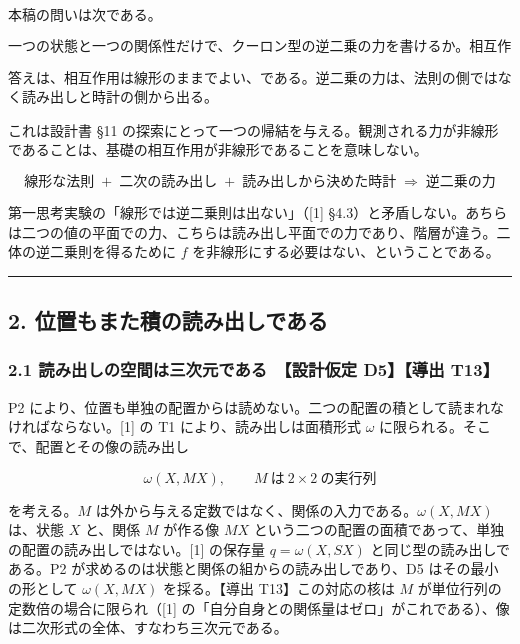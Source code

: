 \documentclass[
  a4paper,
]{ltjsarticle}
\begin{document}
本稿の問いは次である。

\[
\boxed{\text{一つの状態と一つの関係性だけで、クーロン型の逆二乗の力を書けるか。相互作用は線形のままでよいか。}}
\]

答えは、相互作用は線形のままでよい、である。逆二乗の力は、法則の側ではなく読み出しと時計の側から出る。

これは設計書 §11
の探索にとって一つの帰結を与える。観測される力が非線形であることは、基礎の相互作用が非線形であることを意味しない。

\[
\boxed{\;\text{線形な法則}\;+\;\text{二次の読み出し}\;+\;\text{読み出しから決めた時計}\;\Longrightarrow\;\text{逆二乗の力}\;}
\]

第一思考実験の「線形では逆二乗則は出ない」（{[}1{]}
§4.3）と矛盾しない。あちらは二つの値の平面での力、こちらは読み出し平面での力であり、階層が違う。二体の逆二乗則を得るために
\(f\) を非線形にする必要はない、ということである。

\begin{center}\rule{0.5\linewidth}{0.5pt}\end{center}

\subsection{2.
位置もまた積の読み出しである}\label{ux4f4dux7f6eux3082ux307eux305fux7a4dux306eux8aadux307fux51faux3057ux3067ux3042ux308b}

\subsubsection{2.1 読み出しの空間は三次元である　【設計仮定 D5】【導出
T13】}\label{ux8aadux307fux51faux3057ux306eux7a7aux9593ux306fux4e09ux6b21ux5143ux3067ux3042ux308b-ux8a2dux8a08ux4eeeux5b9a-d5ux5c0eux51fa-t13}

P2
により、位置も単独の配置からは読めない。二つの配置の積として読まれなければならない。{[}1{]}
の T1 により、読み出しは面積形式 \(\omega\)
に限られる。そこで、配置とその像の読み出し

\[
\omega(X,MX),\qquad M\ \text{は}\ 2\times2\ \text{の実行列}
\]

を考える。\(M\)
は外から与える定数ではなく、関係の入力である。\(\omega(X,MX)\) は、状態
\(X\) と、関係 \(M\) が作る像 \(MX\)
という二つの配置の面積であって、単独の配置の読み出しではない。{[}1{]}
の保存量 \(q=\omega(X,SX)\) と同じ型の読み出しである。P2
が求めるのは状態と関係の組からの読み出しであり、D5 はその最小の形として
\(\omega(X,MX)\) を採る。【導出 T13】この対応の核は \(M\)
が単位行列の定数倍の場合に限られ（{[}1{]}
の「自分自身との関係量はゼロ」がこれである）、像は二次形式の全体、すなわち三次元である。
\end{document}
